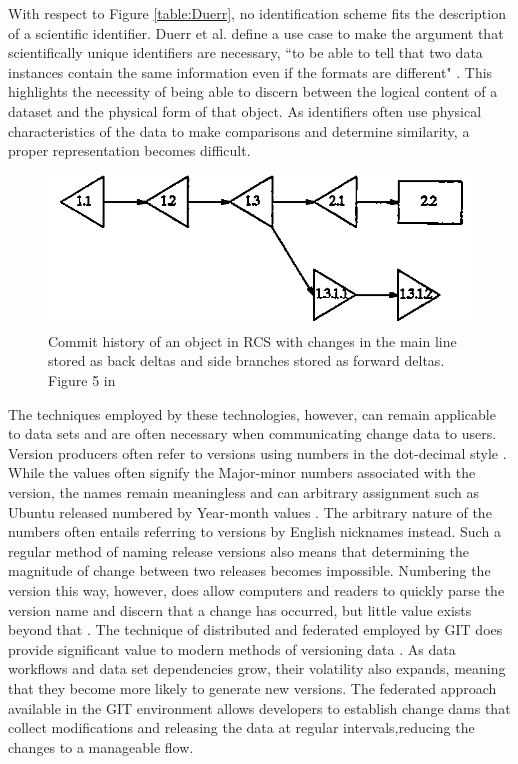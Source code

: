 With respect to Figure \ref{table:Duerr}, no identification scheme fits the description of a scientific identifier.
Duerr et al. define a use case to make the argument that scientifically unique identifiers are necessary, ``to be able to tell that two data instances contain the same information even if the formats are different" \cite{Duerr2011}.
This highlights the necessity of being able to discern between the logical content of a dataset and the physical form of that object.
As identifiers often use physical characteristics of the data to make comparisons and determine similarity, a proper representation becomes difficult.

\begin{figure}[b]
	\centering
	\includegraphics[scale=0.75]{figures/RCSCommitTree.png}
	\caption{Commit history of an object in RCS with changes in the main line stored as back deltas and side branches stored as forward deltas.  Figure 5 in \cite{tichy1985rcs}}
	\label{RCSTree}
\end{figure}

The techniques employed by these technologies, however, can remain applicable to data sets and are often necessary when communicating change data to users.
Version producers often refer to versions using numbers in the dot-decimal style \cite{Stuckenholz:2005:CEV:1039174.1039197}.
While the values often signify the Major-minor numbers associated with the version, the names remain meaningless and can arbitrary assignment such as Ubuntu released numbered by Year-month values \cite{Ubuntu}.
The arbitrary nature of the numbers often entails referring to versions by English nicknames instead.
Such a regular method of naming release versions also means that determining the magnitude of change between two releases becomes impossible.
Numbering the version this way, however, does allow computers and readers to quickly parse the version name and discern that a change has occurred, but little value exists beyond that \cite{Dijkstra1994}.
The technique of distributed and federated employed by GIT does provide significant value to modern methods of versioning data \cite{cederqvist2002version}.
As data workflows and data set dependencies grow, their volatility also expands, meaning that they become more likely to generate new versions.
The federated approach available in the GIT environment allows developers to establish change dams that collect modifications and releasing the data at regular intervals,reducing the changes to a manageable flow.

